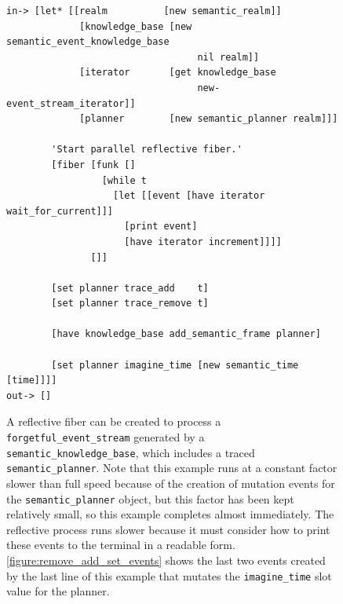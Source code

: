 \begin{figure}[h]
\centering
{\scriptsize
\begin{Verbatim}[frame=single]
 in-> [let* [[realm          [new semantic_realm]]
             [knowledge_base [new semantic_event_knowledge_base
                                  nil realm]]
             [iterator       [get knowledge_base
                                  new-event_stream_iterator]]
             [planner        [new semantic_planner realm]]]

        'Start parallel reflective fiber.'
        [fiber [funk []
                 [while t
                   [let [[event [have iterator wait_for_current]]]
                     [print event]
                     [have iterator increment]]]]
               []]
        
        [set planner trace_add    t]
        [set planner trace_remove t]
        
        [have knowledge_base add_semantic_frame planner]
        
        [set planner imagine_time [new semantic_time [time]]]]
out-> []
\end{Verbatim}
}
\caption[A reflective fiber can be created to process an
  {\tt{forgetful\_event\_stream}}.]{A reflective fiber can be created
  to process a {\tt{forgetful\_event\_stream}} generated by a
  {\tt{semantic\_knowledge\_base}}, which includes a traced
  {\tt{semantic\_planner}}.  Note that this example runs at a constant
  factor slower than full speed because of the creation of mutation
  events for the {\tt{semantic\_planner}} object, but this factor has
  been kept relatively small, so this example completes almost
  immediately.  The reflective process runs slower because it must
  consider how to print these events to the terminal in a readable
  form.  {\mbox{\autoref{figure:remove_add_set_events}}} shows the
  last two events created by the last line of this example that
  mutates the {\tt{imagine\_time}} slot value for the planner.}
\label{figure:reflective_fiber}
\end{figure}

